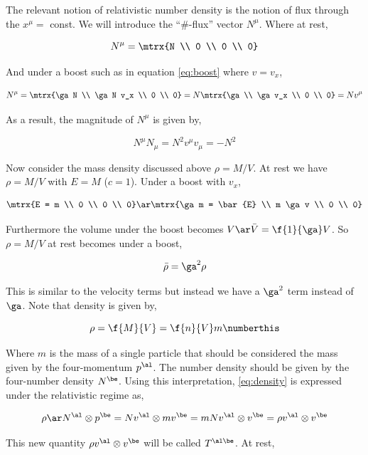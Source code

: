 \documentclass{article}
\begin{document}
The relevant notion of relativistic number density is the notion of flux through the $x^\mu = $ const. We will introduce the ``\#-flux'' vector $N^\mu$. Where at rest,

\[ N^\mu = \mtrx{N \\ 0 \\ 0 \\ 0} \]

And under a boost such as in equation \eqref{eq:boost} where $v = v_x$,

\[ N^\mu = \mtrx{\ga N \\ \ga N v_x \\ 0 \\ 0} = N \mtrx{\ga \\ \ga v_x \\ 0 \\ 0} = N v^\mu \]

As a result, the magnitude of $N^\mu$ is given by,

\[ N^\mu N_\mu = N^2 v^\mu v_\mu = - N^2 \]

Now consider the mass density discussed above $\rho = M/V$. At rest we have $\rho = M/V$ with $E = M$ ($c=1$). Under a boost with $v_x$,

\[ \mtrx{E = m \\ 0 \\ 0 \\ 0} \ar \mtrx{\ga m = \bar{E} \\ m \ga v \\ 0 \\ 0} \]

Furthermore the volume under the boost becomes $V \ar \bar{V} = \f{1}{\ga} V$. So $\rho = M/V$ at rest becomes under a boost,

\[ \bar{\rho} = \ga^2 \rho \]

This is similar to the velocity terms but instead we have a $\ga^2$ term instead of $\ga$. Note that density is given by,

\[ \rho = \f{M}{V} = \f{n}{V} m \numberthis \label{eq:density}\]

Where $m$ is the mass of a single particle that should be considered the mass given by the four-momentum $p^\al$. The number density should be given by the four-number density $N^\be$. Using this interpretation, \eqref{eq:density} is expressed under the relativistic regime as,

\[ \rho \ar  N^\al \otimes p^\be = N v^\al \otimes m v^\be = m N v^\al \otimes v^\be = \rho v^\al \otimes v^\be \]

This new quantity $\rho v^\al \otimes v^\be$ will be called $T^{\al\be}$. At rest,
\end{document}
